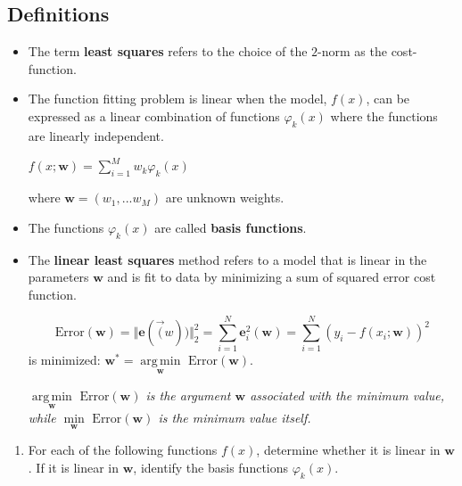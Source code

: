 \documentclass[12pt,letterpaper,noanswers]{exam}
\newcommand{\vc}[1]{\boldsymbol{#1}}
\DeclareMathOperator*{\argmin}{arg\,min} %
\begin{document}
\subsection{Definitions}
\begin{tcolorbox}
\begin{itemize}
\itemsep0pt
    \item The term \textbf{least squares} refers to the choice of the $2$-norm as the cost-function.
    \item The function fitting problem is linear when the model, $f(x)$, can be expressed as a linear combination of functions $\varphi_k(x)$ where the functions are linearly independent.
    
    $\displaystyle f(x; \vc{w}) = \sum\limits_{i=1}^M w_k \varphi_k(x)$
    
    where $\vc{w} = (w_1,...w_M)$ are unknown weights.
    \item The functions $\varphi_k(x)$ are called \textbf{basis functions}.
    \item The \textbf{linear least squares} method refers to a model that is linear in the parameters $\vc{w}$ and is fit to data by minimizing a sum of squared error cost function.
    
    \[\text{Error}(\vc{w}) = \Vert \vc{e}(\vec(w))\Vert_2^2 = \sum\limits_{i=1}^N \vc{e}_i^2(\vc{w}) = \sum\limits_{i=1}^N \left(y_i - f(x_i; \vc{w})\right)^2\] is minimized: $\vc{w}^* = \argmin\limits_{\vc{w}} \text{ Error}(\vc{w}).$
    
    \emph{$\argmin\limits_{\vc{w}} \text{ Error}(\vc{w})$ is the argument $\vc{w}$ associated with the minimum value, while $\min\limits_{\vc{w}} \text{ Error}(\vc{w})$ is the minimum value itself.}
\end{itemize}

\end{tcolorbox}

\begin{enumerate}[resume=classQ]
\item For each of the following functions $f(x)$, determine whether it is linear in $\vc{w}$.  If it is linear in $\vc{w}$, identify the basis functions $\varphi_k(x)$.
\end{enumerate}
\end{document}
